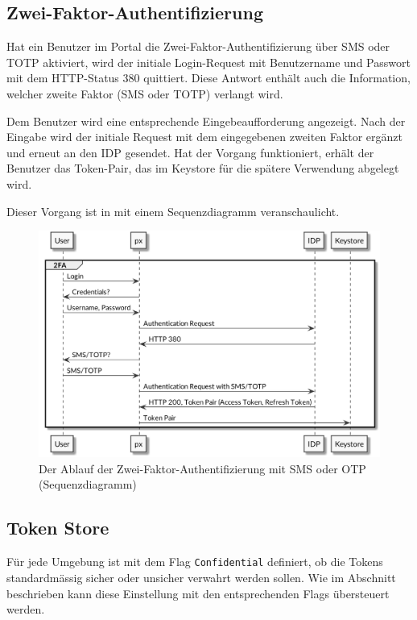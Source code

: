 \subsection{Zwei-Faktor-Authentifizierung}

Hat ein Benutzer im Portal die Zwei-Faktor-Authentifizierung über SMS oder TOTP aktiviert, wird der initiale Login-Request mit Benutzername und Passwort mit dem HTTP-Status 380 quittiert. Diese Antwort enthält auch die Information, welcher zweite Faktor (SMS oder TOTP) verlangt wird.

Dem Benutzer wird eine entsprechende Eingebeaufforderung angezeigt. Nach der Eingabe wird der initiale Request mit dem eingegebenen zweiten Faktor ergänzt und erneut an den IDP gesendet. Hat der Vorgang funktioniert, erhält der Benutzer das Token-Pair, das im Keystore für die spätere Verwendung abgelegt wird.

Dieser Vorgang ist in  mit einem Sequenzdiagramm veranschaulicht.

\begin{figure}
    \centering
    \includegraphics[width=\linewidth]{pics/sequence-2fa.png}
    \caption{Der Ablauf der Zwei-Faktor-Authentifizierung mit SMS oder OTP (Sequenzdiagramm)}
    \label{fig:2fa}
\end{figure}

\subsection{Token Store}
\label{sec:Realisierung-Token-Store}

Für jede Umgebung ist mit dem Flag \texttt{Confidential} definiert, ob die Tokens standardmässig sicher oder unsicher verwahrt werden sollen. Wie im Abschnitt  beschrieben kann diese Einstellung mit den entsprechenden Flags übersteuert werden.

